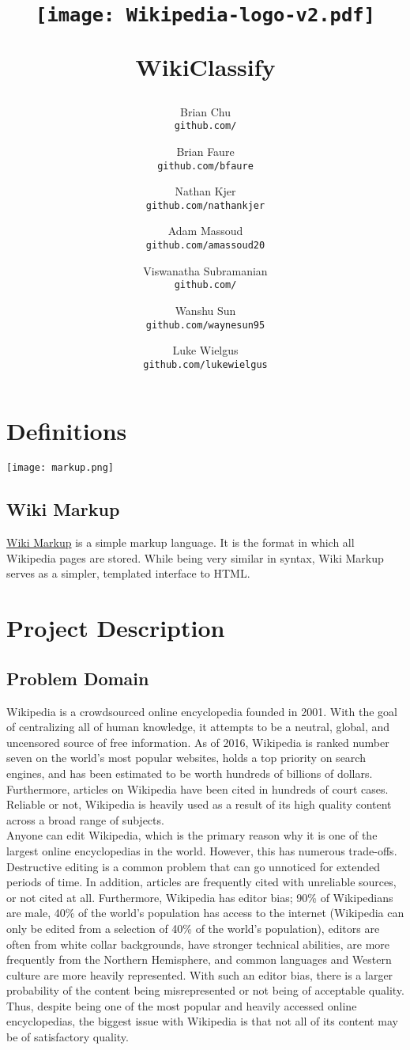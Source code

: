 \documentclass[10pt]{article}
\author{
  Brian Chu\\
  \texttt{github.com/}
  \and
  Brian Faure\\
  \texttt{github.com/bfaure}
  \and
  Nathan Kjer\\
  \texttt{github.com/nathankjer}
  \and
  Adam Massoud\\
  \texttt{github.com/amassoud20}
  \and
  Viswanatha Subramanian\\
  \texttt{github.com/}
  \and
  Wanshu Sun\\
  \texttt{github.com/waynesun95}
  \and
  Luke Wielgus\\
  \texttt{github.com/lukewielgus}
}
\date{}
\title{\centerline{\texttt{[image: Wikipedia-logo-v2.pdf]}}\vspace{3em}WikiClassify}
\begin{document}
\clearpage\maketitle
\thispagestyle{empty}
\newpage
\setcounter{page}{1}
\tableofcontents
\section{Definitions}
\centerline{\texttt{[image: markup.png]}}
\subsection*{Wiki Markup}
\href{https://en.wikipedia.org/wiki/Help:Wiki_markup}{Wiki Markup} is a simple markup language. It is the format in which all Wikipedia pages are stored. While being very similar in syntax, Wiki Markup serves as a simpler, templated interface to HTML.
\section{Project Description}
\subsection{Problem Domain}
\hspace*{28pt}Wikipedia is a crowdsourced online encyclopedia founded in 2001. With the goal of centralizing all of human knowledge, it attempts to be a neutral, global, and uncensored source of free information. As of 2016, Wikipedia is ranked number seven on the world’s most popular websites, holds a top priority on search engines, and has been estimated to be worth hundreds of billions of dollars. Furthermore, articles on Wikipedia have been cited in hundreds of court cases. Reliable or not, Wikipedia is heavily used as a result of its high quality content across a broad range of subjects.\\
\hspace*{28pt}Anyone can edit Wikipedia, which is the primary reason why it is one of the largest online encyclopedias in the world. However, this has numerous trade-offs. Destructive editing is a common problem that can go unnoticed for extended periods of time. In addition, articles are frequently cited with unreliable sources, or not cited at all. Furthermore, Wikipedia has editor bias; 90\% of Wikipedians are male, 40\% of the world's population has access to the internet (Wikipedia can only be edited from a selection of 40\% of the world's population), editors are often from white collar backgrounds, have stronger technical abilities, are more frequently from the Northern Hemisphere, and common languages and Western culture are more heavily represented. With such an editor bias, there is a larger probability of the content being misrepresented or not being of acceptable quality.\\
\hspace*{28pt}Thus, despite being one of the most popular and heavily accessed online encyclopedias, the biggest issue with Wikipedia is that not all of its content may be of satisfactory quality.
\end{document}
